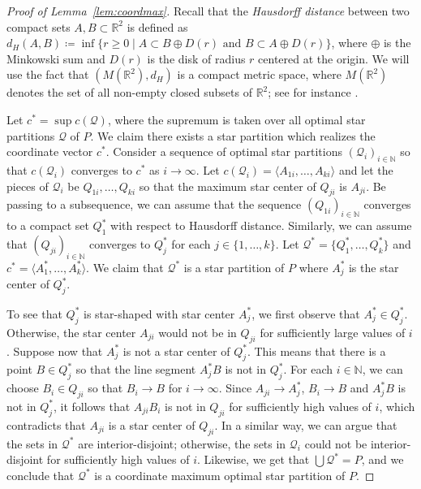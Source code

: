 \documentclass{theoretics}
\newcommand{\RR}{\mathbb{R}}
\newcommand{\NN}{\mathbb{N}}
\begin{document}
\begin{proof}[Proof of Lemma~\ref{lem:coordmax}]
Recall that the \emph{Hausdorff distance} between two compact sets $A,B \subset \RR^2$ is defined as $d_H(A,B) \coloneqq \inf \{ r \geq 0 \mid A \subset B \oplus D(r) \text{ and } B \subset A \oplus D(r) \}$,
where $\oplus$ is the Minkowski sum and $D(r)$ is the disk of radius $r$ centered at the origin.
We will use the fact that $(M(\RR^2), d_H)$ is a compact metric space, where $M(\RR^2)$ denotes the set of all non-empty closed subsets of $\RR^2$; see for instance \cite[Theorem~4.5]{evans_probability_2008}.

Let $c^*=\sup c(\mathcal Q)$, where the supremum is taken over all optimal star partitions $\mathcal Q$ of $P$.
We claim there exists a star partition which realizes the coordinate vector $c^*$.
Consider a sequence of optimal star partitions $(\mathcal Q_i)_{i\in\NN}$ so that $c(\mathcal Q_i)$ converges to $c^*$ as $i\longrightarrow\infty$.
Let $c(\mathcal Q_i)=\langle A_{1i},\ldots,A_{ki}\rangle$ and let the pieces of $\mathcal Q_i$ be $Q_{1i},\ldots,Q_{ki}$ so that the maximum star center of $Q_{ji}$ is $A_{ji}$.
Be passing to a subsequence, we can assume that the sequence $(Q_{1i})_{i\in\NN}$ converges to a compact set $Q_1^*$ with respect to Hausdorff distance.
Similarly, we can assume that $(Q_{ji})_{i\in\NN}$ converges to $Q_j^*$ for each $j\in\{1,\ldots,k\}$.
Let $\mathcal Q^*=\{Q_1^*,\ldots,Q_k^*\}$ and $c^*=\langle A_1^*,\ldots,A_k^*\rangle$.
We claim that $\mathcal Q^*$ is a star partition of $P$ where $A_j^*$ is the star center of $Q_j^*$.

To see that $Q_j^*$ is star-shaped with star center $A_j^*$, we first observe that $A_j^*\in Q_j^*$.
Otherwise, the star center $A_{ji}$ would not be in $Q_{ji}$ for sufficiently large values of $i$.
Suppose now that $A_j^*$ is not a star center of $Q_j^*$.
This means that there is a point $B\in Q_j^*$ so that the line segment $A_j^*B$ is not in $Q_j^*$.
For each $i\in\NN$, we can choose $B_i\in Q_{ji}$ so that $B_i\longrightarrow B$ for $i\longrightarrow\infty$.
Since $A_{ji}\longrightarrow A_j^*$, $B_i\longrightarrow B$ and $A_j^*B$ is not in $Q_j^*$, it follows that $A_{ji}B_i$ is not in $Q_{ji}$ for sufficiently high values of $i$, which contradicts that $A_{ji}$ is a star center of $Q_{ji}$.
In a similar way, we can argue that the sets in $\mathcal Q^*$ are interior-disjoint; otherwise, the sets in $\mathcal Q_i$ could not be interior-disjoint for sufficiently high values of $i$.
Likewise, we get that $\bigcup \mathcal Q^*=P$, and we conclude that $\mathcal Q^*$ is a coordinate maximum optimal star partition of $P$.
\end{proof}
\end{document}
